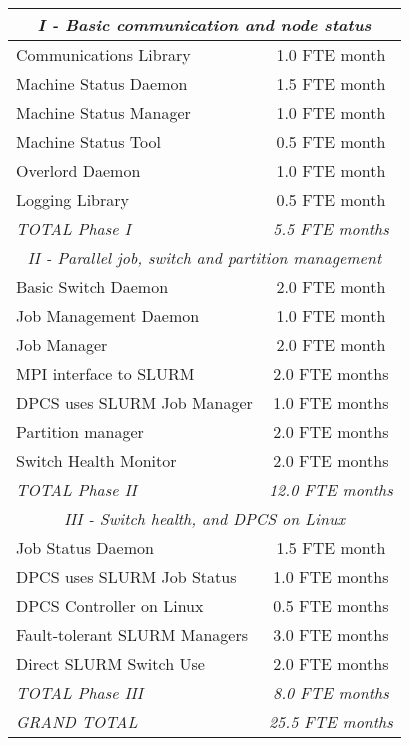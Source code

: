 \begin{center}
\begin{tabular}{|l|c|}\hline
\multicolumn{2}{|c|}{\em I - Basic communication and node status} \\ \hline
Communications Library          & 1.0 FTE month \\
Machine Status Daemon           & 1.5 FTE month \\
Machine Status Manager          & 1.0 FTE month \\
Machine Status Tool             & 0.5 FTE month \\
Overlord Daemon                 & 1.0 FTE month \\
Logging Library                 & 0.5 FTE month \\
{\em TOTAL Phase I}		& {\em 5.5 FTE months} \\ \hline
\multicolumn{2}{|c|}{\em II - Parallel job, switch and partition management} \\ \hline
Basic Switch Daemon             & 2.0 FTE month \\
Job Management Daemon           & 1.0 FTE month \\
Job Manager                     & 2.0 FTE month \\
MPI interface to SLURM          & 2.0 FTE months \\
DPCS uses SLURM Job Manager     & 1.0 FTE months \\
Partition manager               & 2.0 FTE months \\
Switch Health Monitor           & 2.0 FTE months \\
{\em TOTAL Phase II}		& {\em 12.0 FTE months} \\ \hline
\multicolumn{2}{|c|}{\em III - Switch health, and DPCS on Linux} \\ \hline
Job Status Daemon               & 1.5 FTE month \\
DPCS uses SLURM Job Status      & 1.0 FTE months \\
DPCS Controller on Linux        & 0.5 FTE months \\
Fault-tolerant SLURM Managers   & 3.0 FTE months \\
Direct SLURM Switch Use         & 2.0 FTE months \\
{\em TOTAL Phase III}		& {\em 8.0 FTE months} \\ \hline
{\em GRAND TOTAL}		& {\em 25.5 FTE months} \\ \hline
\end{tabular}
\end{center}

